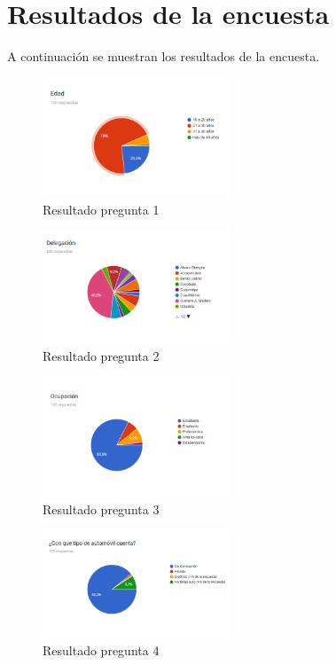\section{Resultados de la encuesta}
A continuación se muestran los resultados de la encuesta.
\begin{figure}[H]
		\centering
		\includegraphics[width=0.5\textwidth]{Apendice2/img/Edad}
		\caption{Resultado pregunta 1}
	\end{figure}
 \begin{figure}[H]
	\centering
	\includegraphics[width=0.5\textwidth]{Apendice2/img/Delegacion}
	\caption{Resultado pregunta 2}
\end{figure}
 \begin{figure}[H]
		\centering
		\includegraphics[width=0.5\textwidth]{Apendice2/img/Ocupacion}
		\caption{Resultado pregunta 3}
	\end{figure}
\begin{figure}[H]
	\centering
	\includegraphics[width=0.5\textwidth]{Apendice2/img/TipoAutomovil}
	\caption{Resultado pregunta 4}
\end{figure}
